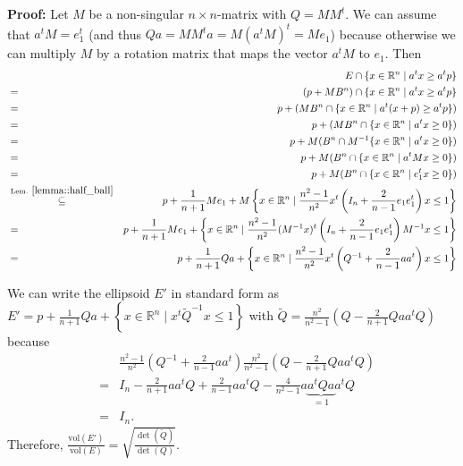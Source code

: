 \documentclass[12pt, showidx, twoside]{article}
\def\prove{\par \noindent \hbox{\bf Proof:}\quad}
\def\R{\mathbb{R}}
\newcommand{\vol}{\text{vol}}
\begin{document}
{{{\prove
Let $M$ be a non-singular $n\times n$-matrix with $Q = MM^t$.
We can assume that 
$a^t M = e_1^t$ (and thus $Qa = M M^t a = M(a^t M)^t = M e_1$)
because otherwise we can multiply $M$ by a rotation matrix
that maps the vector $a^t M$ to $e_1$.
Then
\begin{eqnarray*}
 & &  E \cap \{x \in \R^n \mid a^t x \geq a^t p\}\\
     & = & (p+M B^n) \cap \{x \in \R^n \mid a^t x \geq a^t p\}\\
     & = & p + (M B^n \cap \{x \in \R^n \mid a^t (x+p) \geq a^t p\})\\
     & = & p + (M B^n \cap \{x \in \R^n \mid a^t x \geq 0\})\\
     & = & p + M (B^n \cap M^{-1} \{x \in \R^n \mid a^t x \geq 0\})\\
     & = & p + M (B^n \cap \{x \in \R^n \mid a^t M x \geq 0\})\\
     & = & p + M (B^n \cap \{x \in \R^n \mid e_1^t x \geq 0\})\\
     & \stackrel{\text{Lem. }\ref{lemma::half_ball}}{\subseteq} & p + \frac{1}{n+1} M e_1 + M \left\{x \in \R^n \mid \frac{n^2-1}{n^2}
                    x^t \left(I_n + \frac{2}{n-1}e_1 e_1^t \right)x \leq 1 \right\}\\
     & = & p + \frac{1}{n+1} M e_1 + \left\{x \in \R^n \mid \frac{n^2-1}{n^2}
                    (M^{-1}x)^t\left(I_n + \frac{2}{n-1}e_1 e_1^t \right)M^{-1}x \leq 1 \right\}\\
     & = & p + \frac{1}{n+1} Qa + \left\{x \in \R^n \mid \frac{n^2-1}{n^2}
                    x^t\left(Q^{-1} + \frac{2}{n-1}a a^t \right)x \leq 1 \right\}
\end{eqnarray*}

We can write the ellipsoid $E'$ in standard form as
$ E'= p + \frac{1}{n+1}Q a +
         \left\{x \in \R^n \mid 
                 x^t \tilde Q^{-1} x \leq 1
         \right\}$
with $\tilde Q = \frac{n^2}{n^2-1} \left(Q - \frac{2}{n+1}Qa a^tQ \right)$
because
\begin{eqnarray*}
  & &    \frac{n^2-1}{n^2}  \left(Q^{-1} + \frac{2}{n-1}a a^t \right)
      \frac{n^2}{n^2-1}  \left( Q - \frac{2}{n+1}Qa a^tQ  \right) \\
  & = & I_n
        - \frac{2}{n+1} a a^t Q
        + \frac{2}{n-1} a a^t Q
        - \frac{4}{n^2 - 1} a \underbrace{a^t Q a}_{= 1} a^t Q \\ %
  & = & I_n.
\end{eqnarray*}
Therefore,
$\frac{\vol(E')}{\vol(E)} = \sqrt{\frac{\det(\tilde Q)}{ \det(Q) }}$.

}}}
\end{document}
